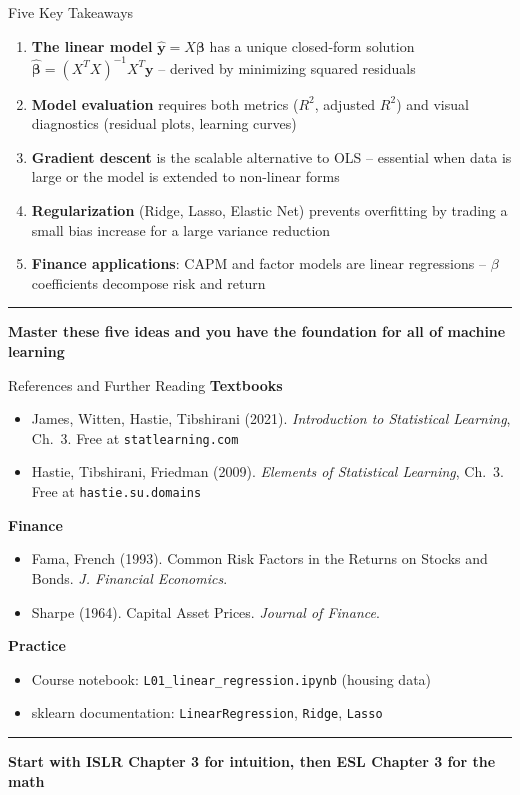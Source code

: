 \documentclass[8pt,aspectratio=169]{beamer}
\newcommand{\bottomnote}[1]{%
\vfill
\vspace{-2mm}
\textcolor{mllavender2}{\rule{\textwidth}{0.4pt}}
\vspace{1mm}
\footnotesize
\textbf{#1}
}
\newenvironment{compactlist}{%
  \begin{itemize}%
    \setlength{\itemsep}{2pt}%
    \setlength{\parskip}{0pt}%
    \setlength{\parsep}{0pt}%
}{%
  \end{itemize}%
}
\newcommand{\highlight}[1]{\textcolor{mlorange}{\textbf{#1}}}
\begin{document}
\begin{frame}[t]{Five Key Takeaways}
\small
\begin{enumerate}
\setlength{\itemsep}{6pt}
\item \highlight{The linear model} $\hat{\mathbf{y}} = X\boldsymbol{\beta}$ has a unique closed-form solution $\hat{\boldsymbol{\beta}} = (X^TX)^{-1}X^T\mathbf{y}$ -- derived by minimizing squared residuals
\item \highlight{Model evaluation} requires both metrics ($R^2$, adjusted $R^2$) and visual diagnostics (residual plots, learning curves)
\item \highlight{Gradient descent} is the scalable alternative to OLS -- essential when data is large or the model is extended to non-linear forms
\item \highlight{Regularization} (Ridge, Lasso, Elastic Net) prevents overfitting by trading a small bias increase for a large variance reduction
\item \highlight{Finance applications}: CAPM and factor models are linear regressions -- $\beta$ coefficients decompose risk and return
\end{enumerate}

\bottomnote{Master these five ideas and you have the foundation for all of machine learning}
\end{frame}

\begin{frame}[t]{References and Further Reading}
\small
\textbf{Textbooks}
\begin{compactlist}
\item James, Witten, Hastie, Tibshirani (2021). \textit{Introduction to Statistical Learning}, Ch.~3. Free at \texttt{statlearning.com}
\item Hastie, Tibshirani, Friedman (2009). \textit{Elements of Statistical Learning}, Ch.~3. Free at \texttt{hastie.su.domains}
\end{compactlist}

\vspace{3mm}
\textbf{Finance}
\begin{compactlist}
\item Fama, French (1993). Common Risk Factors in the Returns on Stocks and Bonds. \textit{J. Financial Economics}.
\item Sharpe (1964). Capital Asset Prices. \textit{Journal of Finance}.
\end{compactlist}

\vspace{3mm}
\textbf{Practice}
\begin{compactlist}
\item Course notebook: \texttt{L01\_linear\_regression.ipynb} (housing data)
\item sklearn documentation: \texttt{LinearRegression}, \texttt{Ridge}, \texttt{Lasso}
\end{compactlist}

\bottomnote{Start with ISLR Chapter 3 for intuition, then ESL Chapter 3 for the math}
\end{frame}
\end{document}
